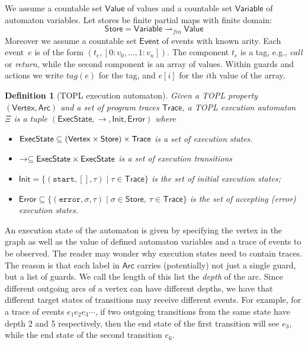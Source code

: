 \documentclass[10pt, preprint]{sigplanconf} %
\newcommand{\pmap}{\rightharpoonup}
\newcommand{\set}[1]{\ensuremath{\mathsf{#1}}}
\newtheorem{definition}{Definition}
\begin{document}
We assume a countable set \set{Value} of values and a countable set $\set{Variable}$ of automaton variables.
Let stores be finite partial maps with finite domain:
\[
\set{Store} = \set{Variable} \pmap_{\mathit{fin}} \set{Value}
\] 
Moreover we assume a countable set \set{Event} of events with known arity.
Each event~$e$ is of the form $(t_e,[0{:} v_0,\dots, 1{:}v_n])$.
The component $t_e$ is a tag, e.g., {\em call} or {\em return}, while the second component is an array of values.
Within guards and actions we write $tag(e)$ for the tag, and $e[i]$ for the $i$th value of the array.
%
\begin{definition}[TOPL execution automaton]
Given a TOPL property $(\set{Vertex},\set{Arc})$ and a set of program traces $\set{Trace}$, a {\em TOPL execution automaton} $\Xi$ is a tuple
$(\set{ExecState}, \to , \set{Init}, \set{Error})$ where
\begin{itemize}
\item $\set{\World} \subseteq (\set{Vertex}\times \set{Store})\times\set{Trace}$ is a set of {\em execution states}.
\item $\to \subseteq \set{\World} \times \set{\World}$ is a set of {\em execution transitions}
\item $\set{Init}= \{ (\texttt{start}, [], \tau) \mid \tau \in \set{Trace} \}$ is the set of initial execution states;
\item $\set{Error} \subseteq \{ (\texttt{error}, \sigma, \tau) \mid \sigma \in \set{Store},  \ \tau \in \set{Trace} \}$ is the set of accepting (error) execution states.
\end{itemize}
\end{definition}
An execution state of the automaton is given by specifying the vertex in the graph as well as the value of defined automaton variables and a trace of events to be observed.
The reader may wonder why execution states need to contain traces.
The reason is that each label in $\set{Arc}$ carries (potentially) not
just a single guard, but a list of guards. We call the length of this list the \emph{depth} of the arc.
Since different outgoing arcs of a vertex can have different depths, we have that different target states of transitions may receive different events.
For example, for a trace of events $e_1 e_2 e_3\cdots$, if two outgoing transitions from the same state have depth 2 and 5 respectively, then the end state of the first transition will see $e_3$, while the end state of the second transition $e_6$.
\end{document}
